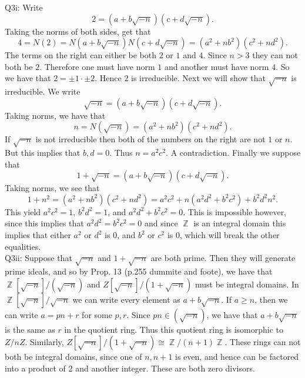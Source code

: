 \documentclass[letterpaper]{article}
\DeclareMathOperator{\Z}{\mathbb{Z}}
\begin{document}
 
\noindent Q3i:
Write $$2 = (a+b\sqrt{-n})(c+d\sqrt{-n}).$$ Taking the norms of both sides, get that $$4 = N(2) = N(a+b \sqrt{-n}) N(c+d\sqrt{-n}) = (a^2+nb^2)(c^2+nd^2).$$ 
The terms on the right can either be both $2$ or $1$ and $4$. Since $n>3$ they can not both be $2$. Therefore one must have norm $1$ and another must have norm $4$. 
So we have that $2 = \pm 1 \cdot \pm 2$. Hence $2$ is irreducible. Next we will show that $\sqrt{-n}$ is irreducible.  We write $$\sqrt{-n} = (a+b\sqrt{-n})(c + d\sqrt{-n}).$$
Taking norms, we have that $$n = N(\sqrt{-n}) = (a^2+nb^2)(c^2+nd^2).$$ If $\sqrt{-n}$ is not irreducible then both of the numbers on the right are not $1$ or $n$. But this implies that $b,d=0$. Thus $n = a^2c^2$. 
A contradiction. Finally we suppose that $$1+ \sqrt{-n} = (a+b\sqrt{-n})(c+d\sqrt{-n} ). $$ Taking norms, we see that $$1+n^2 = (a^2+nb^2)(c^2+nd^2) = a^2c^2 + n(a^2d^2 + b^2c^2) + b^2d^2n^2.$$ 
This yield $a^2c^2 = 1$, $b^2d^2=1$, and $a^2d^2 + b^2c^2=0$. This is impossible however, since this implies that $a^2d^2= b^2c^2 =0$ and since $\Z$ is an integral domain this implies that either 
$a^2$ or $d^2$ is $0$, and $b^2$ or $c^2$ is $0$, which will break the other equalities. 
\newline \\ Q3ii: Suppose that $\sqrt{-n}$ and $1+\sqrt{-n}$ are both prime. Then they will generate prime ideals, and so by Prop. 13 (p.255 dummite and foote), 
we have that $\Z[\sqrt{-n}]/ (\sqrt{-n})$ and $Z[\sqrt{-n}]/ (1+\sqrt{-n})$ must be integral domains. 
In $\Z[\sqrt{-n}]/ \sqrt{-n}$ we can write every element as $a+b\sqrt{-n}$. If $a\geq n$, then we can write $a = pn + r$ for some $p,r$. Since $pn \in (\sqrt{-n})$,
 we have that $a+b\sqrt{-n}$ is the same as $r$ in the quotient ring. Thus this quotient ring is isomorphic to $Z/ nZ$. Similarly, $Z[\sqrt{-n}]/ (1+\sqrt{-n}) \cong \Z/(n+1)\Z$. These rings can not both be integral domains, since one of $n,n+1$ is even, and hence can be factored into a product of 2 and another integer. These are both zero divisors. 
\end{document}

